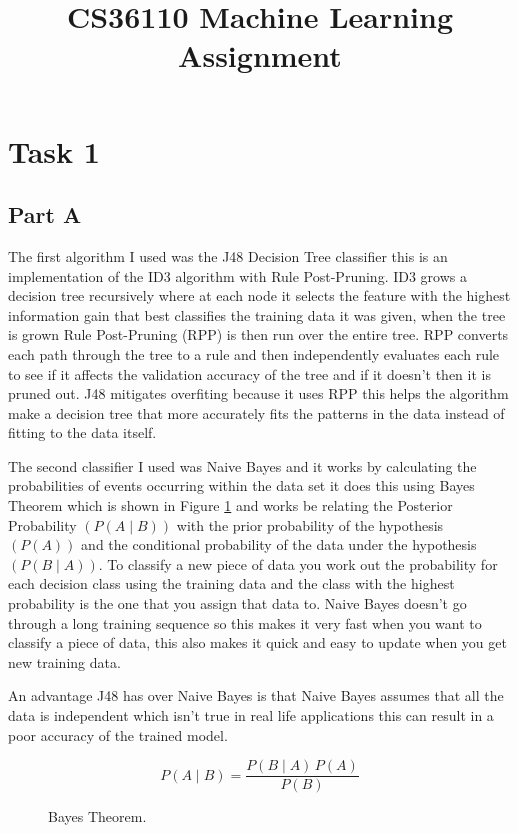 \documentclass[10pt]{article}
\title {CS36110 Machine Learning Assignment}
\date{}                                           %
\begin{document}
\maketitle

\section*{Task 1}

\subsection*{Part A}
The first algorithm I used was the J48 Decision Tree classifier this is an implementation of the ID3 algorithm with Rule Post-Pruning. ID3 grows a decision tree recursively where at each node it selects the feature with the highest information gain that best classifies the training data it was given, when the tree is grown Rule Post-Pruning (RPP) is then run over the entire tree. RPP converts each path through the tree to a rule and then independently evaluates each rule to see if it affects the validation accuracy of the tree and if it doesn't then it is pruned out. J48 mitigates overfiting because it uses RPP this helps the algorithm make a decision tree that more accurately fits the patterns in the data instead of fitting to the data itself.

The second classifier I used was Naive Bayes and it works by calculating the probabilities of events occurring within the data set it does this using Bayes Theorem which is shown in Figure \ref{fig:bayes} and works be relating the Posterior Probability $(P(A \mid B))$ with the prior probability of the hypothesis $(P(A))$ and the conditional probability of the data under the hypothesis $(P(B \mid A))$. To classify a new piece of data you work out the probability for each decision class using the training data and the class with the highest probability is the one that you assign that data to. Naive Bayes doesn't go through a long training sequence so this makes it very fast when you want to classify a piece of data, this also makes it quick and easy to update when you get new training data.

An advantage J48 has over Naive Bayes is that Naive Bayes assumes that all the data is independent which isn't true in real life applications this can result in a poor accuracy of the trained model.


\begin{figure}[h]
    \centering
    $$ P(A \mid B) = \frac{P(B \mid A) \, P(A)}{P(B)} $$
    \caption{Bayes Theorem.}
    \label{fig:bayes}
\end{figure}
\end{document}
